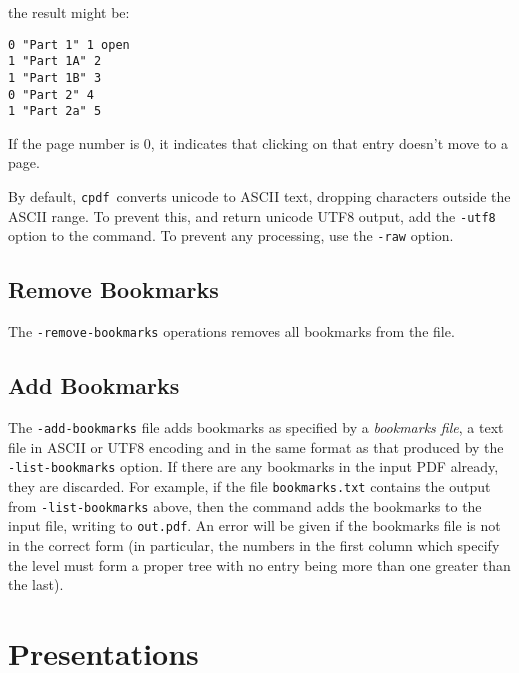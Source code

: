 \documentclass{book}
\newcommand{\cpdf}{\texttt{cpdf}}
\begin{document}
\noindent{}

\noindent the result might be:

\begin{verbatim}
0 "Part 1" 1 open
1 "Part 1A" 2
1 "Part 1B" 3
0 "Part 2" 4
1 "Part 2a" 5\end{verbatim}

\noindent If the page number is 0, it indicates that clicking on that entry doesn't move to a page.

By default, \cpdf\ converts unicode to ASCII text, dropping characters outside
the ASCII range. To prevent this, and return unicode UTF8 output, add the
\texttt{-utf8} option to the command. To prevent any processing, use the
\texttt{-raw} option.

  \section{Remove Bookmarks}
  \label{removebookmarks}
  The \texttt{-remove-bookmarks} operations removes all bookmarks from the file.

\noindent{}

  \section{Add Bookmarks}
  
  The \texttt{-add-bookmarks} file adds bookmarks as specified by a
\textit{bookmarks file}, a text file in ASCII or UTF8 encoding and in the same format as that produced by the
\texttt{-list-bookmarks} option. If there are any bookmarks in the input PDF
already, they are discarded. For example, if the file \texttt{bookmarks.txt}
contains the output from \texttt{-list-bookmarks} above, then the command
\noindent{}
\noindent adds the bookmarks to the input file, writing to \texttt{out.pdf}. An error
will be given if the bookmarks file is not in the correct form (in particular,
the numbers in the first column which specify the level must form a proper
tree with no entry being more than one greater than the last).

\chapter{Presentations}
\end{document}
